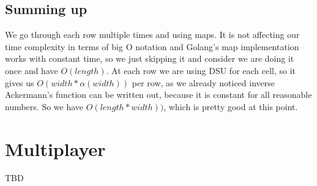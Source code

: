 	\subsection{Summing up}
	We go through each row multiple times and using maps. It is not affecting our time complexity in terms of big O notation and Golang's map implementation works with constant time, so we just skipping it and consider we are doing it once and have $O(length)$. At each row we are using DSU for each cell, so it gives us $O(width*\alpha{}(width))$ per row, as we already noticed inverse Ackermann's function can be written out, because it is constant for all reasonable numbers. So we have $O(length*width))$, which is pretty good at this point.
	
\section{Multiplayer}
TBD